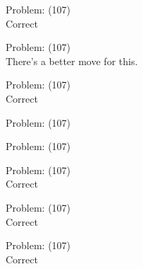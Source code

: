 \documentclass[11pt]{article}
\begin{document}
\begin{minipage}[t]{0.5\textwidth}
  {\centering
  
Problem: (107)\\
Correct\\
  }
\end{minipage}
\begin{minipage}[t]{0.5\textwidth}
  {\centering
  
Problem: (107)\\
There's a better move for this.\\
  }
\end{minipage}
\begin{minipage}[t]{0.5\textwidth}
  {\centering
  
Problem: (107)\\
Correct\\
  }
\end{minipage}
\begin{minipage}[t]{0.5\textwidth}
  {\centering
  
Problem: (107)\\
  }
\end{minipage}
\begin{minipage}[t]{0.5\textwidth}
  {\centering
  
Problem: (107)\\
  }
\end{minipage}
\begin{minipage}[t]{0.5\textwidth}
  {\centering
  
Problem: (107)\\
Correct\\
  }
\end{minipage}
\begin{minipage}[t]{0.5\textwidth}
  {\centering
  
Problem: (107)\\
Correct\\
  }
\end{minipage}
\begin{minipage}[t]{0.5\textwidth}
  {\centering
  
Problem: (107)\\
Correct\\
  }
\end{minipage}
\end{document}
